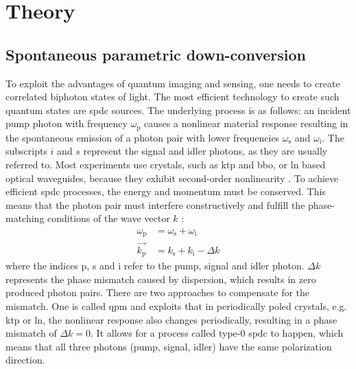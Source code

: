 \section{Theory}
\subsection{Spontaneous parametric down-conversion }
To exploit the advantages of quantum imaging and sensing, one needs to create correlated biphoton states of light. The most efficient technology to create such quantum states are \acrfull{spdc} sources. \newline
The underlying process is as follows: an incident pump photon with frequency $\omega_{\text{p}}$ causes a nonlinear material response resulting in the spontaneous emission of a photon pair with lower frequencies $\omega_{\text{s}}$ and $\omega_{\text{i}}$. The subscripts $i$ and $s$ represent the signal and idler photons, as they are usually referred to. \newline
Most experiments use crystals, such as \acrfull{ktp} and \acrfull{bbo}, or \acrfull{ln} based optical waveguides, because they exhibit second-order nonlinearity \cite{fiorentinoSpontaneousParametricDownconversion2007,kwiatUltrabrightSourcePolarizationentangled1999,tanzilliHighlyEfficientPhotonpair2000}.
To achieve efficient \acrshort{spdc} processes, the energy and momentum must be conserved. This means that the photon pair must interfere constructively and fulfill the phase-matching conditions of the wave vector $k$ \cite{gilabertebassetPerspectivesApplicationsQuantum2019} : 
\begin{equation}
	\begin{aligned}
		\omega_{\text{p}} &= \omega_{\text{s}} + \omega_{\text{i}} \\
		\vec{k_{\text{p}}} &= k_{\text{s}} + k_{\text{i}} - \Delta k
	\end{aligned}
\end{equation}
where the indices p, s and i refer to the pump, signal and idler photon. $\Delta k$ represents the phase mismatch caused by dispersion, which results in zero produced photon pairs. There are two approaches to compensate for the mismatch. \newline
One is called \acrfull{qpm} and exploits that in periodically poled crystals, e.g. \acrshort{ktp} or \acrshort{ln}, the nonlinear response also changes periodically, resulting in a phase mismatch of $\Delta k = 0$. It allows for a process called type-0 \acrshort{spdc} to happen, which means that all three photons (pump, signal, idler) have the same polarization direction. \newline
